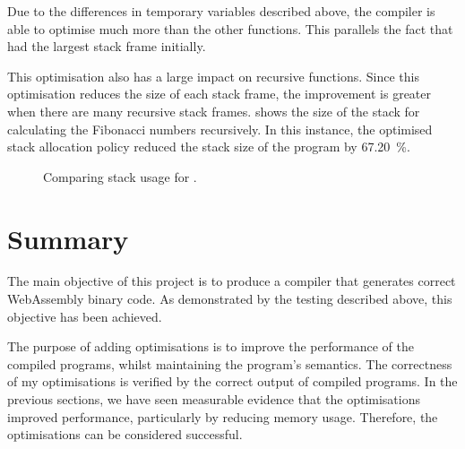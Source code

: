 \documentclass[00-main.tex]{subfiles}
\begin{document}
Due to the differences in temporary variables described above, the compiler is able to optimise  much more than the other functions.
This parallels the fact that  had the largest stack frame initially.


This optimisation also has a large impact on recursive functions.
Since this optimisation reduces the size of each stack frame, the improvement is greater when there are many recursive stack frames.
 shows the size of the stack for calculating the Fibonacci numbers recursively.
In this instance, the optimised stack allocation policy reduced the stack size of the program by \SI{67.20}{\percent}.


\begin{figure}[p]
  \centering
  \caption{Comparing stack usage for .}
  \label{fig:comparing stack usage for fibonacci.c} %
\end{figure}



\section{Summary}

The main objective of this project is to produce a compiler that generates correct WebAssembly binary code.
As demonstrated by the testing described above, this objective has been achieved.

The purpose of adding optimisations is to improve the performance of the compiled programs, whilst maintaining the program's semantics.
The correctness of my optimisations is verified by the correct output of compiled programs.
In the previous sections, we have seen measurable evidence that the optimisations improved performance, particularly by reducing memory usage.
Therefore, the optimisations can be considered successful.
\end{document}
